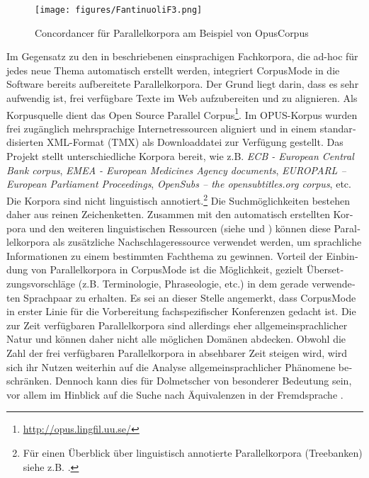 \documentclass[output=paper]{LSP/langsci}
\begin{document}
\begin{otherlanguage}{ngerman}
\begin{figure}
\texttt{[image: figures/FantinuoliF3.png]}
\caption{Concordancer für Parallelkorpora am Beispiel von OpusCorpus}
\label{fig:fantinuoli:3}
\end{figure} 

Im Gegensatz zu den in  beschriebenen einsprachigen Fachkorpora, die ad-hoc für jedes neue Thema automatisch erstellt werden, integriert CorpusMode in die Software bereits aufbereitete Parallelkorpora. Der Grund liegt darin, dass es sehr aufwendig ist, frei verfügbare Texte im Web aufzubereiten und zu alignieren. Als Korpusquelle dient das Open Source Parallel Corpus\footnote{\url{http://opus.lingfil.uu.se/}}. Im OPUS-Korpus wurden frei zugänglich mehrsprachige Internetressourcen aligniert und in einem standardisierten XML-Format (TMX) als Downloaddatei zur Verfügung gestellt. Das Projekt stellt unterschiedliche Korpora bereit, wie z.B. \textit{ECB - European Central Bank corpus}, \textit{EMEA - European Medicines Agency documents}, \textit{EUROPARL -- European Parliament Proceedings}, \textit{OpenSubs -- the opensubtitles.org corpus}, etc. Die Korpora sind nicht linguistisch annotiert.\footnote{Für einen Überblick über linguistisch annotierte Parallelkorpora (Treebanken) siehe z.B. \citet{Hansen-Schirra2009}.} Die Suchmöglichkeiten bestehen daher aus reinen Zeichenketten. Zusammen mit den automatisch erstellten Korpora und den weiteren linguistischen Ressourcen (siehe  und ) können diese Parallelkorpora als zusätzliche Nachschlageressource verwendet werden, um sprachliche Informationen zu einem bestimmten Fachthema zu gewinnen. Vorteil der Einbindung von Parallelkorpora in CorpusMode ist die Möglichkeit, gezielt Übersetzungsvorschläge (z.B. Terminologie, Phraseologie, etc.) in dem gerade verwendeten Sprachpaar zu erhalten. Es sei an dieser Stelle angemerkt, dass CorpusMode in erster Linie für die Vorbereitung fachspezifischer Konferenzen gedacht ist. Die zur Zeit verfügbaren Parallelkorpora sind allerdings eher allgemeinsprachlicher Natur und können daher nicht alle möglichen Domänen abdecken. Obwohl die Zahl der frei verfügbaren Parallelkorpora in absehbarer Zeit steigen wird, wird sich ihr Nutzen weiterhin auf die Analyse allgemeinsprachlicher Phänomene beschränken. Dennoch kann dies für Dolmetscher von besonderer Bedeutung sein, vor allem im Hinblick auf die Suche nach Äquivalenzen in der Fremdsprache \citep{Fantinuoli2006}.


\end{otherlanguage}
\end{document}
